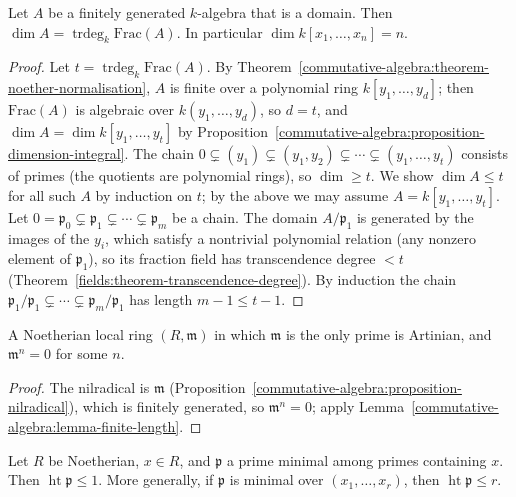 \begin{theorem}\label{commutative-algebra:theorem-dimension-finitely-generated}
Let $A$ be a finitely generated $k$-algebra that is a domain. Then $\dim A = \operatorname{trdeg}_k \mathrm{Frac}(A)$. In particular
$\dim k[x_1, \ldots, x_n] = n$.
\end{theorem}

\begin{proof}
Let $t = \operatorname{trdeg}_k\mathrm{Frac}(A)$. By Theorem~\ref{commutative-algebra:theorem-noether-normalisation}, $A$ is finite over a
polynomial ring $k[y_1, \ldots, y_d]$; then $\mathrm{Frac}(A)$ is algebraic over $k(y_1, \ldots, y_d)$, so $d = t$, and
$\dim A = \dim k[y_1, \ldots, y_t]$ by Proposition~\ref{commutative-algebra:proposition-dimension-integral}. The chain
$0 \subsetneq (y_1) \subsetneq (y_1, y_2) \subsetneq \cdots \subsetneq (y_1, \ldots, y_t)$ consists of primes (the quotients are polynomial
rings), so $\dim \geq t$. We show $\dim A \leq t$ for all such $A$ by induction on $t$; by the above we may assume
$A = k[y_1, \ldots, y_t]$. Let $0 = \mathfrak{p}_0 \subsetneq \mathfrak{p}_1 \subsetneq \cdots \subsetneq \mathfrak{p}_m$ be a chain. The domain $A/\mathfrak{p}_1$ is
generated by the images of the $y_i$, which satisfy a nontrivial polynomial relation (any nonzero element of $\mathfrak{p}_1$), so its
fraction field has transcendence degree $< t$ (Theorem~\ref{fields:theorem-transcendence-degree}). By induction the chain
$\mathfrak{p}_1/\mathfrak{p}_1 \subsetneq \cdots \subsetneq \mathfrak{p}_m/\mathfrak{p}_1$ has length $m - 1 \leq t - 1$.
\end{proof}

\begin{lemma}\label{commutative-algebra:lemma-noetherian-dimension-zero}
A Noetherian local ring $(R, \mathfrak{m})$ in which $\mathfrak{m}$ is the only prime is Artinian, and $\mathfrak{m}^n = 0$ for some $n$.
\end{lemma}

\begin{proof}
The nilradical is $\mathfrak{m}$ (Proposition~\ref{commutative-algebra:proposition-nilradical}), which is finitely generated, so
$\mathfrak{m}^n = 0$; apply Lemma~\ref{commutative-algebra:lemma-finite-length}.
\end{proof}

\begin{theorem}\label{commutative-algebra:theorem-krull-hauptidealsatz}
Let $R$ be Noetherian, $x \in R$, and $\mathfrak{p}$ a prime minimal among primes containing $x$. Then $\operatorname{ht}\mathfrak{p} \leq 1$. More
generally, if $\mathfrak{p}$ is minimal over $(x_1, \ldots, x_r)$, then $\operatorname{ht}\mathfrak{p} \leq r$.
\end{theorem}

